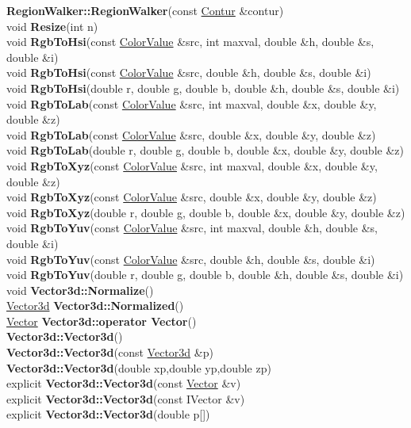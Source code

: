 \documentclass[10pt,titlepage]{article}
\def\functionlistentry#1#2#3#4#5#6{\noindent #1 {\bf #2}(#3) \dotfill #6\\}
\begin{document}
{{\functionlistentry{}{RegionWalker::RegionWalker}{const \hyperlink{Contur}{Contur} \&contur}{194}{datastructures}{}
\functionlistentry{void}{Resize}{int n}{238}{datastructures}{}
\functionlistentry{void}{RgbToHsi}{const \hyperlink{ColorValue}{ColorValue} \&src, int maxval, double \&h, double \&s, double \&i}{295}{datastructures}{}
\functionlistentry{void}{RgbToHsi}{const \hyperlink{ColorValue}{ColorValue} \&src, double \&h, double \&s, double \&i}{296}{datastructures}{}
\functionlistentry{void}{RgbToHsi}{double r, double g, double b, double \&h, double \&s, double \&i}{308}{datastructures}{}
\functionlistentry{void}{RgbToLab}{const \hyperlink{ColorValue}{ColorValue} \&src, int maxval, double \&x, double \&y, double \&z}{301}{datastructures}{}
\functionlistentry{void}{RgbToLab}{const \hyperlink{ColorValue}{ColorValue} \&src, double \&x, double \&y, double \&z}{302}{datastructures}{}
\functionlistentry{void}{RgbToLab}{double r, double g, double b, double \&x, double \&y, double \&z}{315}{datastructures}{}
\functionlistentry{void}{RgbToXyz}{const \hyperlink{ColorValue}{ColorValue} \&src, int maxval, double \&x, double \&y, double \&z}{299}{datastructures}{}
\functionlistentry{void}{RgbToXyz}{const \hyperlink{ColorValue}{ColorValue} \&src, double \&x, double \&y, double \&z}{300}{datastructures}{}
\functionlistentry{void}{RgbToXyz}{double r, double g, double b, double \&x, double \&y, double \&z}{311}{datastructures}{}
\functionlistentry{void}{RgbToYuv}{const \hyperlink{ColorValue}{ColorValue} \&src, int maxval, double \&h, double \&s, double \&i}{297}{datastructures}{}
\functionlistentry{void}{RgbToYuv}{const \hyperlink{ColorValue}{ColorValue} \&src, double \&h, double \&s, double \&i}{298}{datastructures}{}
\functionlistentry{void}{RgbToYuv}{double r, double g, double b, double \&h, double \&s, double \&i}{310}{datastructures}{}
\functionlistentry{void}{Vector3d::Normalize}{}{203}{datastructures}{}
\functionlistentry{\hyperlink{Vector3d}{Vector3d}}{Vector3d::Normalized}{}{202}{datastructures}{}
\functionlistentry{\hyperlink{Vector}{Vector}}{Vector3d::operator Vector}{}{201}{datastructures}{}
\functionlistentry{}{Vector3d::Vector3d}{}{195}{datastructures}{}
\functionlistentry{}{Vector3d::Vector3d}{const \hyperlink{Vector3d}{Vector3d} \&p}{196}{datastructures}{}
\functionlistentry{}{Vector3d::Vector3d}{double xp,double yp,double zp}{197}{datastructures}{}
\functionlistentry{explicit}{Vector3d::Vector3d}{const \hyperlink{Vector}{Vector} \&v}{198}{datastructures}{}
\functionlistentry{explicit}{Vector3d::Vector3d}{const IVector \&v}{199}{datastructures}{}
\functionlistentry{explicit}{Vector3d::Vector3d}{double p[]}{200}{datastructures}{}
}}
\end{document}
